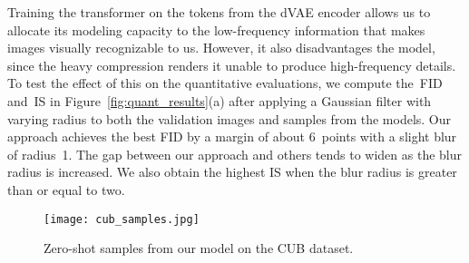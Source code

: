 \documentclass{article}
\begin{document}
Training the transformer on the tokens from the dVAE encoder allows us to allocate its modeling capacity to the low-frequency information that makes images visually recognizable to us. However, it also disadvantages the model, since the heavy compression renders it unable to produce high-frequency details. To test the effect of this on the quantitative evaluations, we compute the~FID and~IS in Figure~\ref{fig:quant_results}(a) after applying a Gaussian filter with varying radius to both the validation images and samples from the models. Our approach achieves the best FID by a margin of about 6~points with a slight blur of radius~1. The gap between our approach and others tends to widen as the blur radius is increased. We also obtain the highest IS when the blur radius is greater than or equal to two.
\begin{figure}[t]
    \centering
    \texttt{[image: cub\_samples.jpg]}
    \caption{Zero-shot samples from our model on the CUB dataset.}
    \label{fig:cub_samples}
    \vspace{-1em}
\end{figure}
\begin{figure*}[t]
    \centering
    \captionsetup[subfigure]{width=2in}
    \hspace{2mm}
    \hspace{2mm}
    \caption{Quantitative results on MS-COCO and CUB. Solid lines represent FID computed against the original validation sets, and dashed lines represent FID computed against validation sets with overlapping images removed (see Section~\ref{sec:data_overlap_analysis}). For MS-COCO, we evaluate all models on a subset of~\num{30000} captions sampled from the validation set. For CUB, we evaluate all models on all of the unique captions in the test set. We compute the FID and IS using the DM-GAN code, which is available at \url{https://github.com/MinfengZhu/DM-GAN}.}
    \label{fig:quant_results}
\end{figure*}
\end{document}
